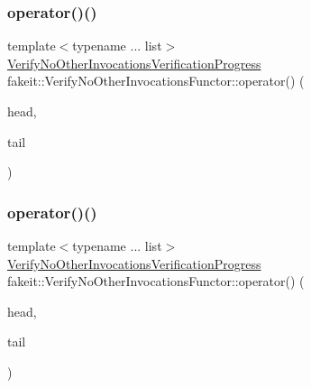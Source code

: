 \mbox{\label{classfakeit_1_1VerifyNoOtherInvocationsFunctor_a6f43e7d3b976534fa8f22abfad04004a}} 
\subsubsection{\texorpdfstring{operator()()}{operator()()}\hspace{0.1cm}{\footnotesize\ttfamily [13/18]}}
{\footnotesize\ttfamily template$<$typename ... list$>$ \\
\mbox{\hyperlink{classfakeit_1_1VerifyNoOtherInvocationsVerificationProgress}{Verify\+No\+Other\+Invocations\+Verification\+Progress}} fakeit\+::\+Verify\+No\+Other\+Invocations\+Functor\+::operator() (\begin{DoxyParamCaption}\item[{const \mbox{\hyperlink{structfakeit_1_1ActualInvocationsSource}{Actual\+Invocations\+Source}} \&}]{head,  }\item[{const list \&...}]{tail }\end{DoxyParamCaption})\hspace{0.3cm}{\ttfamily [inline]}}

\mbox{\label{classfakeit_1_1VerifyNoOtherInvocationsFunctor_a6f43e7d3b976534fa8f22abfad04004a}} 
\subsubsection{\texorpdfstring{operator()()}{operator()()}\hspace{0.1cm}{\footnotesize\ttfamily [14/18]}}
{\footnotesize\ttfamily template$<$typename ... list$>$ \\
\mbox{\hyperlink{classfakeit_1_1VerifyNoOtherInvocationsVerificationProgress}{Verify\+No\+Other\+Invocations\+Verification\+Progress}} fakeit\+::\+Verify\+No\+Other\+Invocations\+Functor\+::operator() (\begin{DoxyParamCaption}\item[{const \mbox{\hyperlink{structfakeit_1_1ActualInvocationsSource}{Actual\+Invocations\+Source}} \&}]{head,  }\item[{const list \&...}]{tail }\end{DoxyParamCaption})\hspace{0.3cm}{\ttfamily [inline]}}

